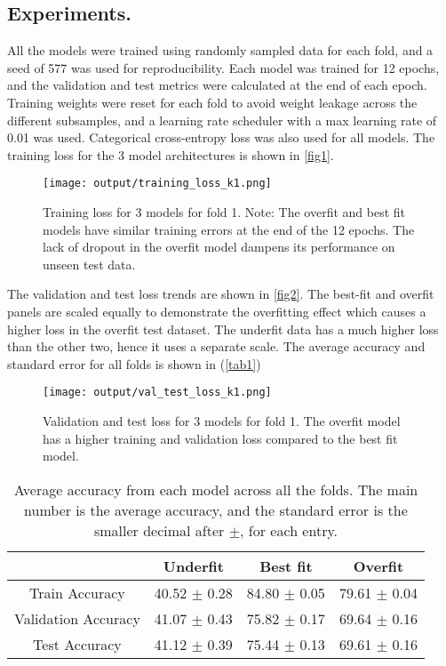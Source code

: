 \documentclass[12pt]{report}
\begin{document}
\begin{enumerate}
    \subsection*{Experiments.}
    All the models were trained using randomly sampled data for each fold, and a seed of 577 was used for reproducibility. Each model was trained for 12 epochs, and the 
    validation and test metrics were calculated at the end of each epoch. Training weights were reset for each fold to avoid weight leakage across the different subsamples, and 
    a learning rate scheduler with a max learning rate of 0.01 was used. Categorical cross-entropy loss was also used for all models. The training loss for the 3 model architectures 
    is shown in \autoref{fig1}.

    \begin{figure}[H]
        \centering
        \texttt{[image: output/training\_loss\_k1.png]}
        \caption{Training loss for 3 models for fold 1. Note: The overfit and best fit models have similar training errors at the end of the 12 epochs. The lack of dropout in the 
        overfit model dampens its performance on unseen test data.}
        \label{fig1}
    \end{figure}

    The validation and test loss trends are shown in \autoref{fig2}. The best-fit and overfit panels are scaled equally to demonstrate the overfitting effect which causes a higher 
    loss in the overfit test dataset. The underfit data has a much higher loss than the other two, hence it uses a separate scale. The average accuracy and standard error for all 
    folds is shown in (\autoref{tab1})

    \begin{figure}[H]
        \centering
        \texttt{[image: output/val\_test\_loss\_k1.png]}
        \caption{Validation and test loss for 3 models for fold 1. The overfit model has a higher training and validation loss compared to the best fit model.}
        \label{fig2}
    \end{figure}

    \begin{table}[h]
    \centering
    \begin{tabular}{|c|c|c|c|}
    \hline
    \  & Underfit & Best fit & Overfit \\ \hline
    Train Accuracy & 40.52 $\pm$ 0.28 & 84.80 $\pm$ 0.05 & 79.61 $\pm$ 0.04 \\ \hline
    Validation Accuracy & 41.07 $\pm$ 0.43 & 75.82 $\pm$ 0.17 & 69.64 $\pm$ 0.16 \\ \hline
    Test Accuracy & 41.12 $\pm$ 0.39 & 75.44 $\pm$ 0.13 & 69.61 $\pm$ 0.16 \\ \hline
    \end{tabular}
    \caption{Average accuracy from each model across all the folds. The main number is the average accuracy, and the standard error is the smaller
    decimal after $\pm$, for each entry.}
    \label{tab1}
    \end{table}


\end{enumerate}
\end{document}
